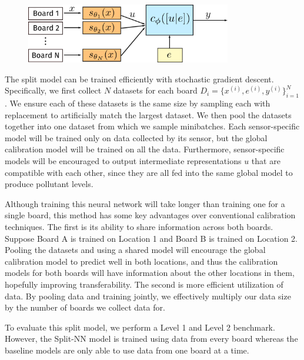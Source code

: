 \documentclass[journal abbreviation, manuscript]{copernicus}
\begin{document}
\begin{figure}
    \includegraphics[width=0.8\textwidth]{writeup/img/split-model.png}
    \caption{}
\end{figure}

The split model can be trained efficiently with stochastic gradient descent. Specifically, we first collect $N$ datasets for each board $D_i = \{x^{(i)}, e^{(i)}, y^{(i)}\}_{i = 1}^N$. We ensure each of these datasets is the same size by sampling each with replacement to artificially match the largest dataset. We then pool the datasets together into one dataset from which we sample minibatches. Each sensor-specific model will be trained only on data collected by its sensor, but the global calibration model will be trained on all the data. Furthermore, sensor-specific models will be encouraged to output intermediate representations $u$ that are compatible with each other, since they are all fed into the same global model to produce pollutant levels.

Although training this neural network will take longer than training one for a single board, this method has some key advantages over conventional calibration techniques. 
The first is its ability to share information across both boards. 
Suppose Board A is trained on Location 1 and Board B is trained on Location 2. Pooling the datasets and using a shared model will encourage the global calibration model to predict well in both locations, and thus the calibration models for both boards will have information about the other locations in them, hopefully improving transferability.
The second is more efficient utilization of data. By pooling data and training jointly, we effectively multiply our data size by the number of boards we collect data for.

To evaluate this split model, we perform a Level 1 and Level 2 benchmark.
However, the Split-NN model is trained using data from every board whereas
the baseline models are only able to use data from one board at a time.
\end{document}
